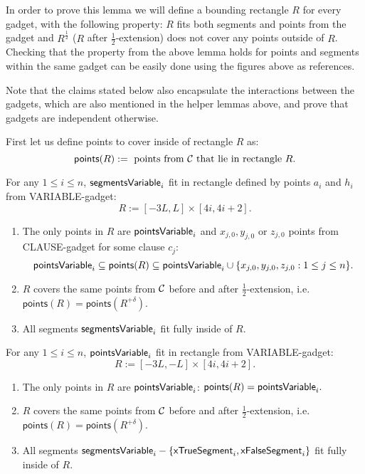 In order to prove this lemma we will define 
a bounding rectangle $R$
for every gadget,
with the following property:
$R$ fits both segments and points from the
gadget and $R^{\frac{1}{2}}$ ($R$ after $\frac{1}{2}$-extension)
does not cover any points outside of $R$.
Checking that the property from the above
lemma holds for points and segments within the same gadget
can be easily done using the figures above as references.


Note that the claims stated below also encapsulate the interactions
between the gadgets,
which are also mentioned in the helper lemmas above,
and prove that gadgets are independent otherwise. 

\newcommand{\pointsIn}{\mathsf{points}}
First let us define points to cover inside of rectangle $R$ as:
$$\pointsIn(R) :=  \text{ points from } \points
\text{ that lie in rectangle } R.$$
 

\begin{claim}
\label{claim:variable_bounding_rectangle}
For any $1 \le i \le n$, $\mathsf{segmentsVariable}_{i}$ fit in rectangle 
defined by points $a_i$ and $h_i$ from VARIABLE-gadget:
$$R := [-3L,L] \times [4i,4i+2].$$
\begin{enumerate}[label={(\arabic*)}]
\item 
The only points in $R$ are $\mathsf{pointsVariable}_{i}$
and $x_{j,0}, y_{j,0}$ or $z_{j,0}$ points 
from CLAUSE-gadget for some clause $c_j$:
$$\pointsVar{i} \subseteq \pointsIn(R) \subseteq \pointsVar{i} \cup
\{x_{j,0}, y_{j,0}, z_{j,0}: 1 \le j \le n\}.$$
\item 
$R$ covers the same points from $\mathcal{C}$
before and after $\frac{1}{2}$-extension, i.e.
$\pointsIn(R) = \pointsIn(R^{+\delta})$.
\item All segments $\mathsf{segmentsVariable}_{i}$ fit fully inside of $R$.
\end{enumerate}
\end{claim}

\begin{claim}
\label{claim:variable_small_bounding_rectangle}
For any $1 \le i \le n$, $\mathsf{pointsVariable}_{i}$ fit in rectangle 
from VARIABLE-gadget:
$$R := [-3L,-L] \times [4i,4i+2].$$
\begin{enumerate}[label={(\arabic*)}]
\item 
The only points in $R$ are $\mathsf{pointsVariable}_{i}$:
$\pointsIn(R) = \pointsVar{i}.$
\item 
$R$ covers the same points from $\mathcal{C}$
before and after $\frac{1}{2}$-extension, i.e.
$\pointsIn(R) = \pointsIn(R^{+\delta})$.
\item All segments $\mathsf{segmentsVariable}_{i} - \{\mathsf{xTrueSegment}_{i}, \mathsf{xFalseSegment}_{i}\}$ 
fit fully inside of $R$.
\end{enumerate}
\end{claim}

